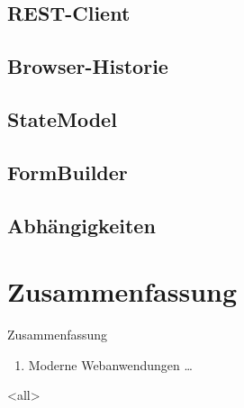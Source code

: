 
\subsection{REST-Client}


\subsection{Browser-Historie}


\subsection{StateModel}


\subsection{FormBuilder}


\subsection{Abhängigkeiten}


\section*{Zusammenfassung}

\begin{frame}{Zusammenfassung}
  \begin{enumerate}
    \item Moderne Webanwendungen \ldots
  \end{enumerate}
\end{frame}

\mode
<all>


